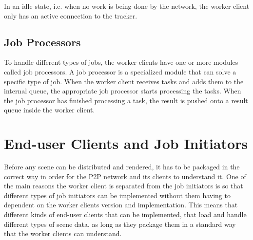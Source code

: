 In an idle state, i.e. when no work is being done by the network, the worker client only has an active connection to the tracker.






\subsection{Job Processors}
  To handle different types of jobs, the worker clients have one or more modules called job processors. A job processor is a specialized module that can solve a specific type of job. When the worker client receives tasks and adds them to the internal queue, the appropriate job processor starts processing the tasks. When the job processor has finished processing a task, the result is pushed onto a result queue inside the worker client.

\section{End-user Clients and Job Initiators}
Before any scene can be distributed and rendered, it has to be packaged in the correct way in order for the P2P network and its clients to understand it. One of the main reasons the worker client is separated from the job initiators is so that different types of job initiators can be implemented without them having to dependent on the worker clients version and implementation. This means that  different kinds of end-user clients that can be implemented, that load and handle different types of scene data, as long as they package them in a standard way that the worker clients can understand.

